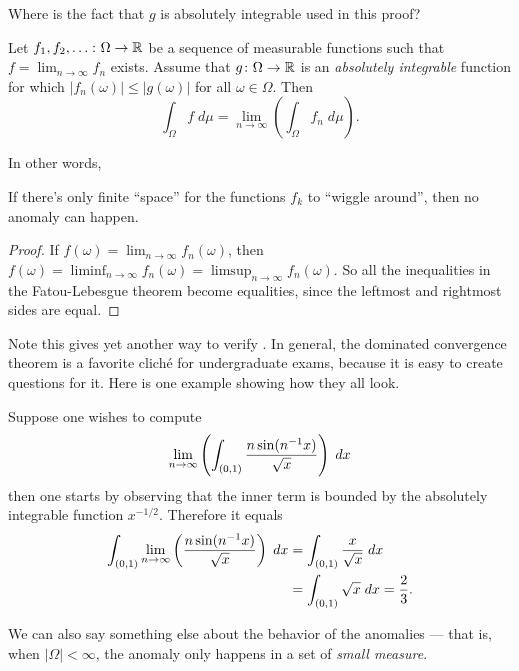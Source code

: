 \begin{exercise}
	Where is the fact that $g$ is absolutely integrable used in this proof?
\end{exercise}

\begin{corollary}
	Let $f_1, f_2, \dots \colon \Omega \to \mathbb R$
	be a sequence of measurable functions
	such that $f = \lim_{n \to \infty} f_n$ exists.
	Assume that $g \colon \Omega \to \mathbb R$ is an
	\emph{absolutely integrable} function for which
	$|f_n(\omega)| \le |g(\omega)|$ for all $\omega \in \Omega$.
	Then
	\[ \int_\Omega f \; d \mu
		= \lim_{n \to \infty} \left( \int_\Omega f_n \; d\mu \right). \]
\end{corollary}

In other words,
\begin{moral}
	If there's only finite ``space'' for the functions $f_k$ to ``wiggle around'',
	then no anomaly can happen.
\end{moral}

\begin{proof}
	If $f(\omega) = \lim_{n \to \infty} f_n(\omega)$,
	then $f(\omega) = \liminf_{n \to \infty} f_n(\omega)
	= \limsup_{n \to \infty} f_n(\omega)$.
	So all the inequalities in the Fatou-Lebesgue theorem
	become equalities, since the leftmost and rightmost sides are equal.
\end{proof}
Note this gives yet another way to verify .
In general, the dominated convergence theorem
is a favorite clich\'{e} for undergraduate exams,
because it is easy to create questions for it.
Here is one example showing how they all look.
\begin{example}
	Suppose one wishes to compute
	\[ \lim_{n \to \infty}
		\left( \int_{(0,1)} \frac{n\sin(n^{-1} x)}{\sqrt x} \right) \; dx \]
	then one starts by observing that
	the inner term is bounded by the absolutely integrable function $x^{-1/2}$.
	Therefore it equals
	\begin{align*}
		\int_{(0,1)} \lim_{n \to \infty}
			\left( \frac{n\sin(n^{-1} x)}{\sqrt x} \right) \; dx
		&= \int_{(0,1)} \frac{x}{\sqrt x} \; dx \\
		&= \int_{(0,1)} \sqrt{x} \; dx = \frac23.
	\end{align*}
\end{example}

We can also say something else about the behavior of the anomalies --- that is, when
$|\Omega| < \infty$, the anomaly only happens in a set of \emph{small measure}.

